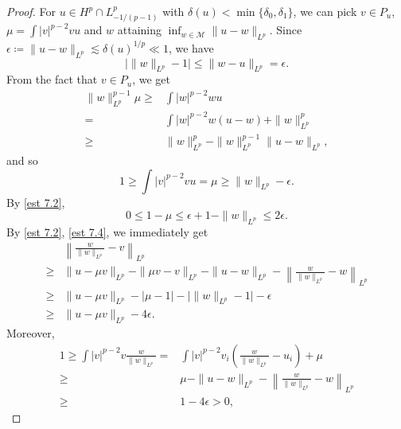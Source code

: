 \documentclass[11pt]{article}
\numberwithin{equation}{section}
\begin{document}
\begin{proof}
    For $u\in H^p\cap L^p_{-1/(p-1)}$ with $\delta(u)<\min\{\delta_0,\delta_1\}$, we can pick $v\in P_u$, $\mu = \int |v|^{p-2}vu$ and $w$ attaining $\inf_{w\in \mathcal{M}}\|u-w\|_{L^p}$. Since $\epsilon \coloneqq \|u-w\|_{L^p} \lesssim \delta(u)^{1/p} \ll 1$, we have
    \begin{equation}\label{est 7.2}
        \big|\|w\|_{L^p} - 1\big| \le \|w-u\|_{L^p} = \epsilon.
    \end{equation}
    From the fact that $v\in P_{u}$, we get
    \begin{align*}
        \|w\|_{L^p}^{p-1}\mu \ge{}& \int |w|^{p-2}wu\\
        ={}& \int |w|^{p-2}w(u-w) + \|w\|_{L^p}^p \\
        \ge{}& \|w\|_{L^p}^p - \|w\|_{L^p}^{p-1}\|u-w\|_{L^p},
    \end{align*}
    and so
    \begin{equation}\label{est 7.3}
        1\ge \int |v|^{p-2}vu = \mu \ge \|w\|_{L^p} - \epsilon.
    \end{equation}
    By \eqref{est 7.2},
    \begin{equation}\label{est 7.4}
        0\le 1-\mu \le \epsilon + 1-\|w\|_{L^p} \le 2\epsilon.
    \end{equation}
    By \eqref{est 7.2}, \eqref{est 7.4}, we immediately get
    \begin{equation}\label{est 7.5}
        \begin{split}
            & \left\|\frac{w}{\|w\|_{L^p}}-v\right\|_{L^p} \\
            \ge{}& \|u-\mu v\|_{L^p} - \|\mu v-v\|_{L^p} - \|u-w\|_{L^p} - \left\|\frac{w}{\|w\|_{L^p}}-w\right\|_{L^p}\\
            \ge{}& \|u-\mu v\|_{L^p} - |\mu-1| - \big|\|w\|_{L^p} - 1\big| - \epsilon\\
            \ge{}& \|u-\mu v\|_{L^p} - 4\epsilon.
        \end{split}
    \end{equation}
    Moreover,
    \begin{equation}\label{est 7.6}
        \begin{aligned}
            1 \ge \int |v|^{p-2}v\frac{w}{\|w\|_{L^p}} ={}& \int |v|^{p-2}v_i\left(\frac{w}{\|w\|_{L^p}}-u_i\right) + \mu\\
            \ge{}& \mu - \|u-w\|_{L^p} - \left\|\frac{w}{\|w\|_{L^p}}-w\right\|_{L^p}\\
            \ge{}& 1-4\epsilon > 0,

\end{aligned}
\end{equation}
\end{proof}
\end{document}
